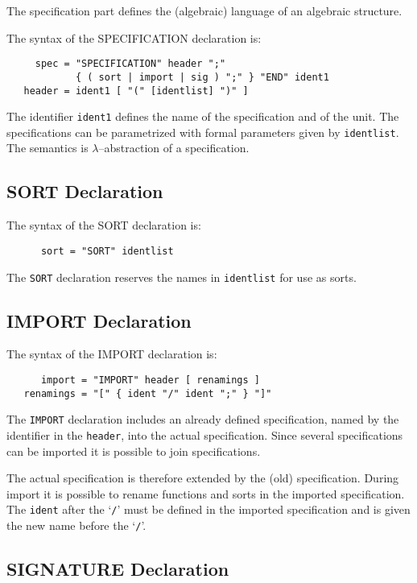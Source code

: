 The specification part defines the 
(algebraic) language of an algebraic structure.

The syntax of the SPECIFICATION declaration is:
\begin{verbatim}
     spec = "SPECIFICATION" header ";" 
            { ( sort | import | sig ) ";" } "END" ident1
   header = ident1 [ "(" [identlist] ")" ]
\end{verbatim}
The identifier \verb/ident1/ defines the name 
of the specification and of the unit.
The specifications can be parametrized 
with formal parameters given by \verb/identlist/.  
The semantics is $\lambda$--abstraction
of a specification. 

\subsection{SORT Declaration}

The syntax of the SORT declaration is:
\begin{verbatim}
      sort = "SORT" identlist   
\end{verbatim}
The \verb/SORT/ declaration reserves the names 
in \verb/identlist/ for use as sorts.

\subsection{IMPORT Declaration}

The syntax of the IMPORT declaration is:
\begin{verbatim}
      import = "IMPORT" header [ renamings ]   
   renamings = "[" { ident "/" ident ";" } "]"
\end{verbatim}
The \verb/IMPORT/ declaration 
includes an already defined specification, 
named by the identifier in the \verb/header/,
into the actual specification. 
Since several specifications can be imported 
it is possible to join specifications.

The actual specification is therefore extended 
by the (old) specification. 
During import it is possible to rename functions 
and sorts in the imported specification.
The \verb/ident/ after the `\verb./.' must be 
defined in the imported specification and  
is given the new name before the `\verb./.'.

\subsection{SIGNATURE Declaration}

